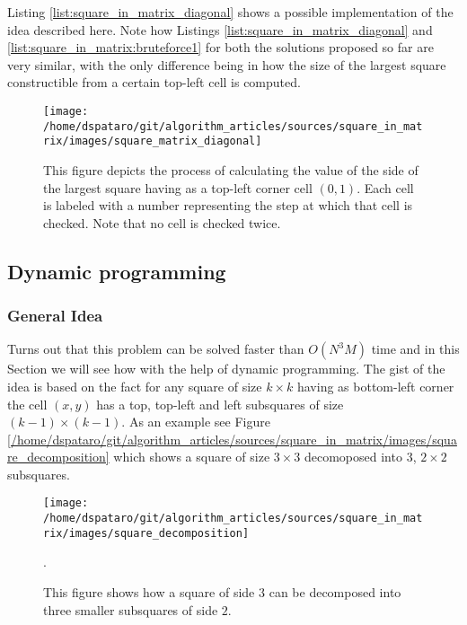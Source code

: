 Listing \ref{list:square_in_matrix_diagonal} shows a possible implementation of the idea described
here. Note how Listings \ref{list:square_in_matrix_diagonal} and
\ref{list:square_in_matrix:bruteforce1} for both the solutions proposed so far are very similar,
with the only difference being in how the size of the largest square constructible from a certain
top-left cell is computed.

\begin{figure}
	\centering
	\label{fig:square_in_matrix:square_matrix_diagonal}
	\texttt{[image: /home/dspataro/git/algorithm\_articles/sources/square\_in\_matrix/images/square\_matrix\_diagonal]}
	\caption[Square in matrix - Brute-force diagonal]{This figure depicts the process of calculating the value of the side of the largest square having as a top-left corner cell $(0,1)$. Each cell is labeled with a number representing the step at which that cell is checked. Note that no cell is checked twice.}
\end{figure}





\subsection{Dynamic programming}
\subsubsection{General Idea}
\label{sec:square_in_matrix:DP}
Turns out that this problem can be solved faster than $O(N^3M)$ time and in this Section we will see
how with the help of dynamic programming. The gist of the idea is based on the fact for any square
of size $k\times k$ having as bottom-left corner the cell $(x,y)$  has a top, top-left and left
subsquares of size $(k-1)\times (k-1)$. As an example see Figure
\ref{/home/dspataro/git/algorithm_articles/sources/square_in_matrix/images/square_decomposition} which shows a square of size $3\times 3$
decomoposed into $3$, $2\times 2$ subsquares.
\begin{figure}
	\centering
	\label{fig:square_in_matrix:squa_matrix_incremental}
	\texttt{[image: /home/dspataro/git/algorithm\_articles/sources/square\_in\_matrix/images/square\_decomposition]}
	\caption[Square of side $3$ decomposition into $3$ subsquares of side $2$.]
			{This figure shows how a square of side $3$ can be decomposed into three smaller
	subsquares of side $2$.}.
\end{figure}

